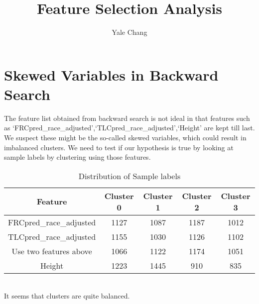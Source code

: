 \documentclass[11pt]{article}
\title{\textbf{Feature Selection Analysis}}
\author{Yale Chang}
\date{}
\begin{document}
\maketitle

\section{Skewed Variables in Backward Search}
The feature list obtained from backward search is not ideal in that features such as `FRCpred\_race\_adjusted',`TLCpred\_race\_adjusted',`Height' are kept till last. We suspect these might be the so-called skewed variables, which could result in imbalanced clusters. We need to test if our hypothesis is true by looking at sample labels by clustering using those features.
\begin{table}[ht]
\caption{Distribution of Sample labels}
\centering
\begin{tabular}{c c c c c}
\hline\hline
Feature & Cluster 0 & Cluster 1 & Cluster 2 & Cluster 3\\[1ex]
\hline
FRCpred\_race\_adjusted & 1127 & 1087 & 1187 &1012\\
TLCpred\_race\_adjusted & 1155 & 1030 & 1126 &1102\\
Use two features above & 1066 & 1122 & 1174 &1051\\
Height & 1223 & 1445 & 910 & 835\\[1ex]
\hline
\end{tabular}
\label{table:dist_cluster_labels}
\end{table}  
\\
It seems that clusters are quite balanced. 
\end{document}
